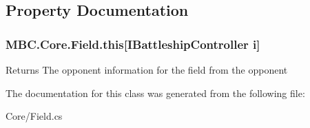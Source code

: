 \subsection{Property Documentation}
\hypertarget{class_m_b_c_1_1_core_1_1_field_a68bea4ce761a6ddca725e952213a9949}{
\subsubsection[{this[I\-Battleship\-Controller i]}]{ M\-B\-C.\-Core.\-Field.\-this\mbox{[}{\bf I\-Battleship\-Controller} i\mbox{]}\hspace{0.3cm}{\ttfamily [get]}}}\label{class_m_b_c_1_1_core_1_1_field_a68bea4ce761a6ddca725e952213a9949}
\begin{DoxyReturn}{Returns}
The opponent information for the field from the opponent
\end{DoxyReturn}


The documentation for this class was generated from the following file\-:\begin{DoxyCompactItemize}
\item 
Core/Field.\-cs\end{DoxyCompactItemize}
